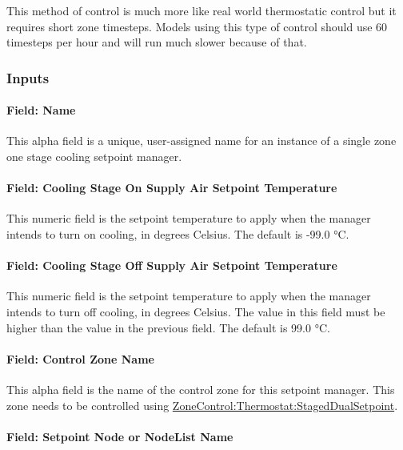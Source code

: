 This method of control is much more like real world thermostatic control but it requires short zone timesteps. Models using this type of control should use 60 timesteps per hour and will run much slower because of that.

\subsubsection{Inputs}\label{inputs-25-002}

\paragraph{Field: Name}\label{field-name-25-001}

This alpha field is a unique, user-assigned name for an instance of a single zone one stage cooling setpoint manager.

\paragraph{Field: Cooling Stage On Supply Air Setpoint Temperature}\label{field-cooling-stage-on-supply-air-setpoint-temperature}

This numeric field is the setpoint temperature to apply when the manager intends to turn on cooling, in degrees Celsius. The default is -99.0 °C.

\paragraph{Field: Cooling Stage Off Supply Air Setpoint Temperature}\label{field-cooling-stage-off-supply-air-setpoint-temperature}

This numeric field is the setpoint temperature to apply when the manager intends to turn off cooling, in degrees Celsius. The value in this field must be higher than the value in the previous field. The default is 99.0 °C.

\paragraph{Field: Control Zone Name}\label{field-control-zone-name-3}

This alpha field is the name of the control zone for this setpoint manager. This zone needs to be controlled using \hyperref[zonecontrolthermostatstageddualsetpoint]{ZoneControl:Thermostat:StagedDualSetpoint}.

\paragraph{Field: Setpoint Node or NodeList Name}\label{field-setpoint-node-or-nodelist-name-20}

